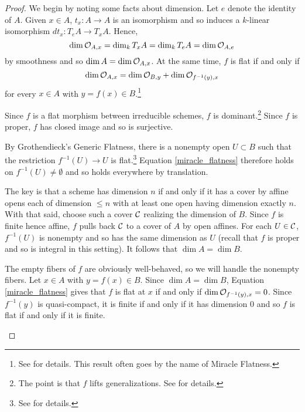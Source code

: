 \documentclass[11pt]{article}
\begin{document}
\begin{proof}
We begin by noting some facts about dimension. Let $e$ denote the identity of $A$. Given $x\in A$, $t_x: A\to A$ is an isomorphism and so induces a $k$-linear isomorphism $dt_x: T_eA\to T_xA$. Hence,
$$\dim\mathcal{O}_{A,x}=\dim_kT_xA=\dim_kT_eA=\dim\mathcal{O}_{A,e}$$
by smoothness and so $\dim A=\dim\mathcal{O}_{A,x}$. At the same time, $f$ is flat if and only if 
\begin{equation}\label{miracle_flatness}
\dim\mathcal{O}_{A,x}=\dim\mathcal{O}_{B,y}+\dim\mathcal{O}_{f^{-1}(y),x}
\end{equation}
for every $x\in A$ with $y=f(x)\in B$.\footnote{See \cite[\textrm{Tag 00R4}]{Stack} for details. This result often goes by the name of Miracle Flatness.}
\begin{enum}{\alph}
\item Since $f$ is a flat morphism between irreducible schemes, $f$ is dominant.\footnote{The point is that $f$ lifts generalizations. See \cite{Dominant} for details.} Since $f$ is proper, $f$ has closed image and so is surjective.

\item By Grothendieck's Generic Flatness, there is a nonempty open $U\subset B$ such that the restriction $f^{-1}(U)\to U$ is flat.\footnote{See \cite[\textrm{Tag 0529}]{Stack} for details.} Equation \eqref{miracle_flatness} therefore holds on $f^{-1}(U)\neq\emptyset$ and so holds everywhere by translation.

\item The key is that a scheme has dimension $n$ if and only if it has a cover by affine opens each of dimension $\leq n$ with at least one open having dimension exactly $n$. With that said, choose such a cover $\mathcal{C}$ realizing the dimension of $B$. Since $f$ is finite hence affine, $f$ pulls back $\mathcal{C}$ to a cover of $A$ by open affines. For each $U\in\mathcal{C}$, $f^{-1}(U)$ is nonempty and so has the same dimension as $U$ (recall that $f$ is proper and so is integral in this setting). It follows that $\dim A=\dim B$. 

\item The empty fibers of $f$ are obviously well-behaved, so we will handle the nonempty fibers. Let $x\in A$ with $y=f(x)\in B$. Since $\dim A=\dim B$, Equation \eqref{miracle_flatness} gives that $f$ is flat at $x$ if and only if $\dim\mathcal{O}_{f^{-1}(y),x}=0$. Since $f^{-1}(y)$ is quasi-compact, it is finite if and only if it has dimension $0$ and so $f$ is flat if and only if it is finite. \qedhere
\end{enum}
\end{proof}
\end{document}
